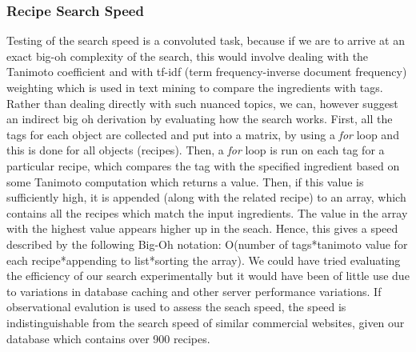 \subsubsection{Recipe Search Speed}
Testing of the search speed is a convoluted task, because if we are to arrive at an exact big-oh complexity of the search, this would involve dealing with the Tanimoto coefficient and with tf-idf (term frequency-inverse document frequency) weighting which is used in text mining to compare the ingredients with tags. Rather than dealing directly with such nuanced topics, we can, however suggest an indirect big oh derivation by evaluating how the search works.
First, all the tags for each object are collected and put into a matrix, by using a \emph{for} loop and this is done for all objects (recipes).
Then, a \emph{for} loop is run on each tag for a particular recipe, which compares the tag with the specified ingredient based on some Tanimoto computation which returns a value.
Then, if this value is sufficiently high, it is appended (along with the related recipe) to an array, which contains all the recipes which match the input ingredients. The value in the array with the highest value appears higher up in the seach.
Hence, this gives a speed described by the following Big-Oh notation: O(number of tags*tanimoto value for each recipe*appending to list*sorting the array).
We could have tried evaluating the efficiency of our search experimentally but it would have been of little use due to variations in database caching and other server performance variations.
If observational evalution is used to assess the seach speed, the speed is indistinguishable from the search speed of similar commercial websites, given our database which contains over 900 recipes.
